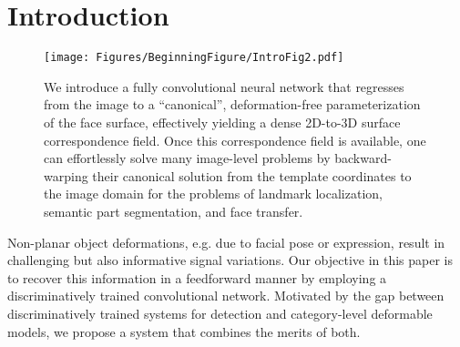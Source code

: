 \documentclass[10pt,twocolumn,letterpaper]{article}
\begin{document}
\section{Introduction}\begin{figure}[t]
\vspace{-0.05cm}
\begin{center}
  \texttt{[image: Figures/BeginningFigure/IntroFig2.pdf]}
\end{center}
\vspace{-0.35cm}
   \caption{We introduce a fully convolutional neural network that regresses from the image to a ``canonical'', deformation-free parameterization of the face surface, effectively yielding a dense 2D-to-3D surface correspondence field. Once this correspondence field is available, one can effortlessly solve many image-level problems by backward-warping their canonical solution from the template coordinates to the image domain for the problems of landmark localization, semantic part segmentation, and face transfer.} 
   	
\vspace{-0.35cm}
\label{fig:FaceIntroFig}
\end{figure}

Non-planar object deformations, e.g. due to facial pose or expression, result in challenging but also informative signal variations. Our objective in this paper is to recover this information in a feedforward manner by employing a discriminatively trained convolutional network. Motivated by the gap between discriminatively trained systems for detection and category-level deformable models, we propose a system that combines the merits of both.
\end{document}
